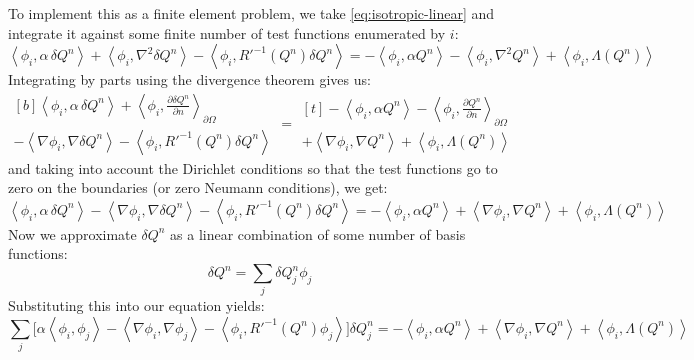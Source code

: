 \documentclass[reqno]{article}
\begin{document}
	To implement this as a finite element problem, we take \eqref{eq:isotropic-linear} and integrate it against some finite number of test functions enumerated by $i$:
	\begin{equation}
		\left< \phi_i, \alpha \, \delta Q^n \right>
		+ \left< \phi_i, \nabla^2 \delta Q^n \right>
		- \left< \phi_i, R'^{-1}(Q^n) \delta Q^n \right>
		=
		- \left< \phi_i, \alpha Q^n \right>
		- \left< \phi_i, \nabla^2 Q^n \right>
		+ \left< \phi_i, \Lambda(Q^n) \right>
	\end{equation}
	Integrating by parts using the divergence theorem gives us:
	\begin{equation}
    \begin{multlined}[b]
		\left< \phi_i, \alpha \, \delta Q^n \right>
    + \left< \phi_i, \frac{\partial \delta Q^n}{\partial n}  \right>_{\partial \Omega} \\
    - \left< \nabla \phi_i, \nabla \delta Q^n \right>
		- \left< \phi_i, R'^{-1}(Q^n) \delta Q^n \right>
    \end{multlined}
		=
    \begin{multlined}[t]
		- \left< \phi_i, \alpha Q^n \right>
    - \left< \phi_i, \frac{\partial Q^n}{\partial n} \right>_{\partial \Omega} \\
    + \left< \nabla \phi_i, \nabla Q^n \right>
		+ \left< \phi_i, \Lambda(Q^n) \right>
    \end{multlined}
	\end{equation}
  and taking into account the Dirichlet conditions so that the test functions go
  to zero on the boundaries (or zero Neumann conditions), we get:
	\begin{equation}
		\left< \phi_i, \alpha \, \delta Q^n \right>
		- \left< \nabla \phi_i, \nabla \delta Q^n \right>
		- \left< \phi_i, R'^{-1}(Q^n) \delta Q^n \right>
		=
		- \left< \phi_i, \alpha Q^n \right>
		+ \left< \nabla \phi_i, \nabla Q^n \right>
		+ \left< \phi_i, \Lambda(Q^n) \right>
	\end{equation}
	Now we approximate $\delta Q^n$ as a linear combination of some number of basis functions:
	\begin{equation}
		\delta Q^n = \sum_j \delta Q^n_j \phi_j
	\end{equation}
	Substituting this into our equation yields:
	\begin{equation}
		\sum_j \biggl[
		\alpha \left< \phi_i, \phi_j \right>
		- \left< \nabla \phi_i, \nabla \phi_j \right>
		- \left< \phi_i, R'^{-1}(Q^n) \phi_j \right>
		\biggr] \delta Q^n_j
		=
		- \left< \phi_i, \alpha Q^n \right>
		+ \left< \nabla \phi_i, \nabla Q^n \right>
		+ \left< \phi_i, \Lambda(Q^n) \right>
	\end{equation}
\end{document}
